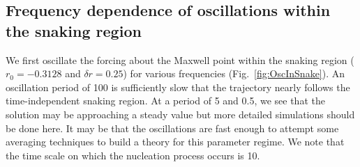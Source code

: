 \documentclass[pre,preprint,superscriptaddress]{revtex4-1}
\begin{document}
\subsection{Frequency dependence of oscillations within the snaking region}
We first oscillate the forcing about the Maxwell point within the snaking region ($r_0=-0.3128$ and $\delta r = 0.25$)  for various frequencies (Fig.~\ref{fig:OscInSnake}).   An oscillation period of 100 is sufficiently slow that the trajectory nearly follows the time-independent snaking region.  At a period of 5 and 0.5, we see that the solution may be approaching a steady value but more detailed simulations should be done here.  It may be that the oscillations are fast enough to attempt some averaging techniques to build a theory for this parameter regime.   We note that the time scale on which the nucleation process occurs is 10.
\end{document}

